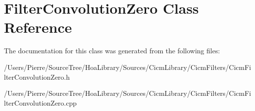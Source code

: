 \hypertarget{class_filter_convolution_zero}{\section{Filter\-Convolution\-Zero Class Reference}
\label{class_filter_convolution_zero}
}


The documentation for this class was generated from the following files\-:\begin{DoxyCompactItemize}
\item 
/\-Users/\-Pierre/\-Source\-Tree/\-Hoa\-Library/\-Sources/\-Cicm\-Library/\-Cicm\-Filters/Cicm\-Filter\-Convolution\-Zero.\-h\item 
/\-Users/\-Pierre/\-Source\-Tree/\-Hoa\-Library/\-Sources/\-Cicm\-Library/\-Cicm\-Filters/Cicm\-Filter\-Convolution\-Zero.\-cpp\end{DoxyCompactItemize}
